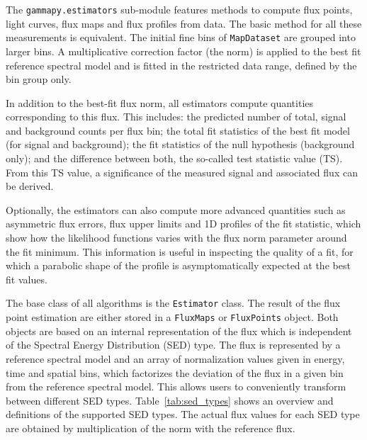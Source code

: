 \documentclass[longauth]{aa}
\newcommand{\code}[1]{\texttt{#1}}
\begin{document}
The \code{gammapy.estimators} sub-module features methods to compute flux
points, light curves, flux maps and flux profiles from data.
The basic method for all these measurements is equivalent.
The initial fine bins of \code{MapDataset} are grouped into
larger bins. A multiplicative correction factor (the norm)
is applied to the best fit reference spectral
model and is fitted in the restricted data range, defined by the 
bin group only.

In addition to the best-fit flux norm, all estimators compute
quantities corresponding to this flux. This includes:
the predicted number of total, signal and background
counts per flux bin; the total fit statistics
of the best fit model (for signal and background); the fit statistics of the
null hypothesis (background only); and the difference between both,
the so-called test statistic value (TS).
From this TS value, a significance of the measured signal and associated flux
can be derived.

Optionally, the estimators can also compute more advanced quantities
such as asymmetric flux errors, flux upper limits
and 1D profiles of the fit statistic,
which show how the likelihood functions varies with
the flux norm parameter around the fit minimum.
This information is useful in inspecting the quality
of a fit, for which a parabolic
shape of the profile is asymptomatically expected at the best fit
values.

The base class of all algorithms is the \code{Estimator}  class.
The result of the flux point estimation are either stored in a
\code{FluxMaps} or \code{FluxPoints} object. Both objects
are based on an internal representation of the flux which is
independent of the Spectral Energy Distribution (SED) type. The flux is represented
by a reference spectral model and an array of
normalization values given in energy, time and spatial bins,
which factorizes the deviation of the flux in a given
bin from the reference spectral model. This allows
users to conveniently transform between different
SED types. Table~\ref{tab:sed_types} shows an
overview and definitions of the supported SED types.
The actual flux values for each SED type are obtained
by multiplication of the {norm} with the reference flux.
\end{document}
